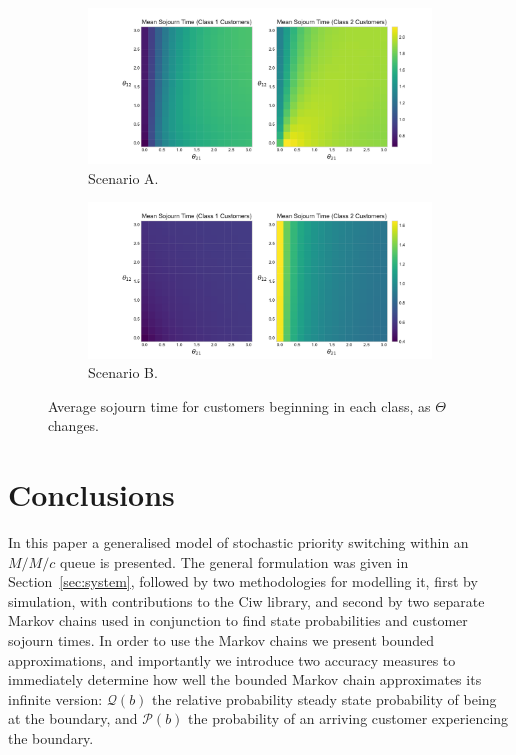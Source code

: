 \documentclass{article}
\begin{document}
\begin{figure}
  \begin{center}
  \begin{subfigure}[b]{0.49\textwidth}
    \includegraphics[width=\textwidth]{img/vary_thetas_sojourn_scen1.pdf}
    \caption{Scenario A.}
    \label{fig:sojourn_A}
  \end{subfigure}
  \begin{subfigure}[b]{0.49\textwidth}
    \includegraphics[width=\textwidth]{img/vary_thetas_sojourn_scen2.pdf}
    \caption{Scenario B.}
    \label{fig:sojourn_B}
  \end{subfigure}
  \caption{Average sojourn time for customers beginning in each class, as
  $\Theta$ changes.}
  \end{center}
\end{figure}


\section{Conclusions}
In this paper a generalised model of stochastic priority switching within an
$M/M/c$ queue is presented. The general formulation was given in
Section~\ref{sec:system}, followed by two methodologies for modelling it,
first by simulation, with contributions to the Ciw library, and second by two
separate Markov chains used in conjunction to find state probabilities and
customer sojourn times. In order to use the Markov chains we present bounded
approximations, and importantly we introduce two accuracy measures to
immediately determine how well the bounded Markov chain approximates its
infinite version: $\mathcal{Q}(b)$ the relative probability steady state
probability of being at the boundary, and $\mathcal{P}(b)$ the probability of an
arriving customer experiencing the boundary.
\end{document}
